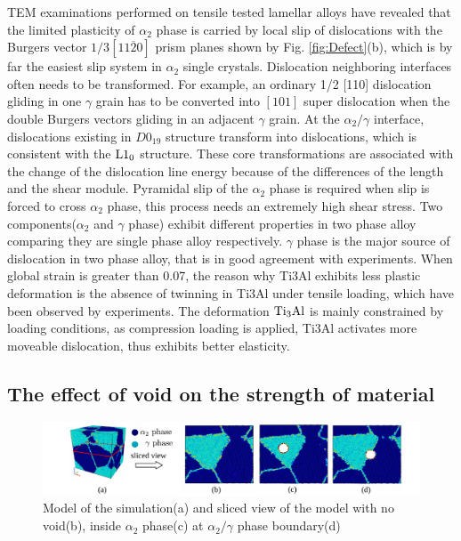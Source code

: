 \documentclass[materials,article,submit,moreauthors,pdftex,10pt,a4paper]{Definitions/mdpi}
\begin{document}
TEM examinations performed on tensile tested lamellar alloys have revealed that the limited plasticity of  $\alpha_2$ phase is carried by local slip of dislocations with the Burgers vector $1/3[11\overline{2}0]$ prism planes shown by Fig. \ref{fig:Defect}(b), which is by far the easiest slip system in $\alpha_2$ single crystals.  Dislocation neighboring interfaces often needs to be transformed. For example, an ordinary 1/2 [110] dislocation gliding in one $\gamma$ grain has to be converted into $[101]$ super dislocation when the double Burgers vectors gliding in an adjacent $\gamma$ grain. At the $\alpha_2/\gamma$ interface, dislocations existing in  $D0_{19}$ structure  transform into dislocations, which is consistent with the $\rm{L1_0}$ structure. These core transformations are associated with the change of the dislocation line energy because of the differences of the length and the shear module.  Pyramidal slip of the $\alpha_2$ phase is required  when slip is forced to cross $\alpha_2$ phase, this process needs an extremely high shear stress. Two components($\alpha_2$ and $\gamma$ phase) exhibit different properties in two phase alloy comparing they are single phase alloy respectively. $\gamma$ phase is the major source of dislocation in two phase alloy, that is in good agreement with experiments\cite{Singh2006a,Appel1998a,Singh2006}. When global strain is greater than 0.07, the reason why Ti3Al exhibits less plastic deformation is the absence of twinning in Ti3Al under tensile loading, which have been observed by experiments\cite{sastry1980plastic}. The deformation $\rm{Ti_3Al}$ is mainly constrained by loading conditions, as compression loading is applied, Ti3Al activates more moveable dislocation, thus exhibits better elasticity\cite{intro-structure}.


\subsection{The effect of void on the strength of material}

\begin{figure}[ht]
	\centering
	\includegraphics[width=1\linewidth]{img/slice-view}
	\caption{Model of the simulation(a) and sliced view of the model with no void(b), inside $\alpha_2$ phase(c) at $\alpha_2 / \gamma$ phase boundary(d)}
	\label{fig:model-creation}
\end{figure}
\end{document}
